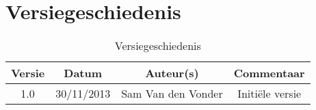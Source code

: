 \chapter{Versiegeschiedenis}

\begin{table}[htbp]
	\centering
	\begin{tabular} {|c|c|c|c|}
	    \hline
		\textbf{Versie} & \textbf{Datum} 	& \textbf{Auteur(s)} & \textbf{Commentaar} \\
		\hline
		1.0	& 30/11/2013	& Sam Van den Vonder & Initi\"{e}le versie \\ \hline
	\end{tabular}
	\caption{Versiegeschiedenis}
\end{table}